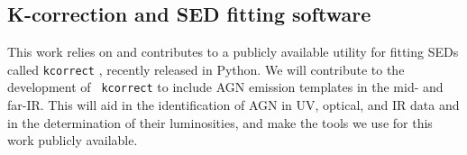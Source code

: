 \documentclass[12pt, preprint]{hacked-aastex}
\begin{document}
%
%

\subsection{K-correction and SED fitting software}

This work relies on and contributes to a publicly available utility
for fitting SEDs called {\tt kcorrect} \cite{blanton07b}, recently
released in Python.  We will contribute to the development of {\tt
  kcorrect} to include AGN emission templates in the mid- and far-IR.
This will aid in the identification of AGN in UV, optical, and IR data
and in the determination of their luminosities, and make the tools we
use for this work publicly available.
\end{document}
